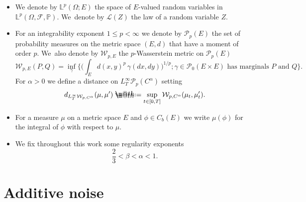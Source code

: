 \documentclass[10pt]{amsart}
\makeatletter
\theoremstyle{definition}
\newcommand{\mcF}{\mathcal{F}}
\newcommand{\mcP}{\mathcal{P}}
\newcommand\mcW{\mathcal W}
\newcommand{\bbL}{\mathbb{L}}
\newcommand{\bbP}{\mathbb{P}}
\newcommand*{\defeq}{\mathrel{\rlap{%
\raisebox{0.3ex}{$\m@th\cdot$}}%
\raisebox{-0.3ex}{$\m@th\cdot$}}%
=}
\newcommand{\dw}{d_{L_T^\infty\mathcal{W}_{p,C^\alpha}}}
\makeatother
\begin{document}
\begin{itemize}
\item
We denote by $\bbL^p(\Omega; E)$ the space of $E$-valued random variables in $\bbL^p(\Omega,\mcF,\bbP)$. We~denote by $\mathcal{L}(Z)$ the law of a random variable $Z$.

\item
For an integrability exponent $1\leq p<\infty$ we denote by $\mcP_p(E)$ the set of probability measures on the metric space $(E,d)$ that have a moment of order $p$. We~also denote by $\mcW_{p,E}$ the $p$-Wasserstein metric on $\mcP_p(E)$
\[
\mcW_{p,E}(P,Q) = \inf_\gamma\textstyle\bigl\{\bigl(\int_E d(x,y)^p \,\gamma(dx,dy)\bigr)^{1/p};
\gamma\in\mcP_0(E\!\times\! E) \textrm{ has marginals } P \textrm{ and } Q\bigr\}.
\]
For $\alpha>0$ we define a distance on $L^\infty_T\mathcal{P}_p(C^\alpha)$ setting
\[
\dw(\mu,\mu') \defeq \sup_{t\in[0, T]} \mathcal{W}_{p,C^\alpha}(\mu_t,\mu'_t).
\]

\item
For a measure $\mu$ on a metric space $E$ and $\phi\in C_b(E)$ we write $\mu(\phi)$ for the integral of $\phi$ with respect to $\mu$.

\item
We fix throughout this work some regularity exponents
\begin{equation} \label{EqConditionAlphaBeta}
\frac{2}{3}<\beta<\alpha<1.
\end{equation}
\end{itemize}

\section{Additive noise}
\label{SectionAdditiveNoise}
\end{document}
